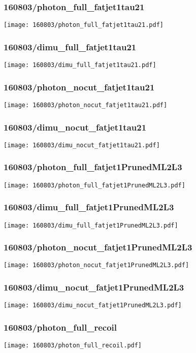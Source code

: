 \begin{frame}
   \frametitle{\small 160803/photon\_full\_fatjet1tau21}
   \centering
   \texttt{[image: 160803/photon\_full\_fatjet1tau21.pdf]}
\end{frame}

\begin{frame}
   \frametitle{\small 160803/dimu\_full\_fatjet1tau21}
   \centering
   \texttt{[image: 160803/dimu\_full\_fatjet1tau21.pdf]}
\end{frame}

\begin{frame}
   \frametitle{\small 160803/photon\_nocut\_fatjet1tau21}
   \centering
   \texttt{[image: 160803/photon\_nocut\_fatjet1tau21.pdf]}
\end{frame}

\begin{frame}
   \frametitle{\small 160803/dimu\_nocut\_fatjet1tau21}
   \centering
   \texttt{[image: 160803/dimu\_nocut\_fatjet1tau21.pdf]}
\end{frame}

\begin{frame}
   \frametitle{\small 160803/photon\_full\_fatjet1PrunedML2L3}
   \centering
   \texttt{[image: 160803/photon\_full\_fatjet1PrunedML2L3.pdf]}
\end{frame}

\begin{frame}
   \frametitle{\small 160803/dimu\_full\_fatjet1PrunedML2L3}
   \centering
   \texttt{[image: 160803/dimu\_full\_fatjet1PrunedML2L3.pdf]}
\end{frame}

\begin{frame}
   \frametitle{\small 160803/photon\_nocut\_fatjet1PrunedML2L3}
   \centering
   \texttt{[image: 160803/photon\_nocut\_fatjet1PrunedML2L3.pdf]}
\end{frame}

\begin{frame}
   \frametitle{\small 160803/dimu\_nocut\_fatjet1PrunedML2L3}
   \centering
   \texttt{[image: 160803/dimu\_nocut\_fatjet1PrunedML2L3.pdf]}
\end{frame}

\begin{frame}
   \frametitle{\small 160803/photon\_full\_recoil}
   \centering
   \texttt{[image: 160803/photon\_full\_recoil.pdf]}
\end{frame}


